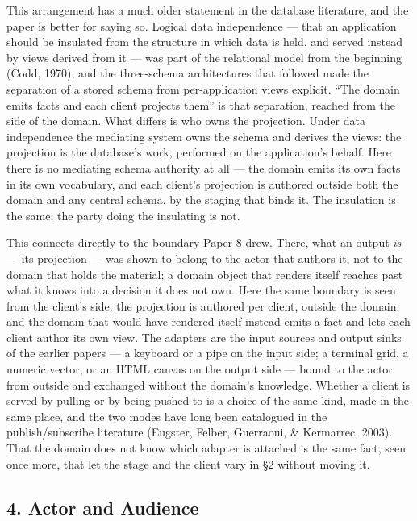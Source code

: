 \documentclass[
]{article}
\begin{document}
This arrangement has a much older statement in the database literature,
and the paper is better for saying so. Logical data independence ---
that an application should be insulated from the structure in which data
is held, and served instead by views derived from it --- was part of the
relational model from the beginning (Codd, 1970), and the three-schema
architectures that followed made the separation of a stored schema from
per-application views explicit. ``The domain emits facts and each client
projects them'' is that separation, reached from the side of the domain.
What differs is who owns the projection. Under data independence the
mediating system owns the schema and derives the views: the projection
is the database's work, performed on the application's behalf. Here
there is no mediating schema authority at all --- the domain emits its
own facts in its own vocabulary, and each client's projection is
authored outside both the domain and any central schema, by the staging
that binds it. The insulation is the same; the party doing the
insulating is not.

This connects directly to the boundary Paper 8 drew. There, what an
output \emph{is} --- its projection --- was shown to belong to the actor
that authors it, not to the domain that holds the material; a domain
object that renders itself reaches past what it knows into a decision it
does not own. Here the same boundary is seen from the client's side: the
projection is authored per client, outside the domain, and the domain
that would have rendered itself instead emits a fact and lets each
client author its own view. The adapters are the input sources and
output sinks of the earlier papers --- a keyboard or a pipe on the input
side; a terminal grid, a numeric vector, or an HTML canvas on the output
side --- bound to the actor from outside and exchanged without the
domain's knowledge. Whether a client is served by pulling or by being
pushed to is a choice of the same kind, made in the same place, and the
two modes have long been catalogued in the publish/subscribe literature
(Eugster, Felber, Guerraoui, \& Kermarrec, 2003). That the domain does
not know which adapter is attached is the same fact, seen once more,
that let the stage and the client vary in §2 without moving it.

\subsection{4. Actor and Audience}\label{actor-and-audience}
\end{document}
